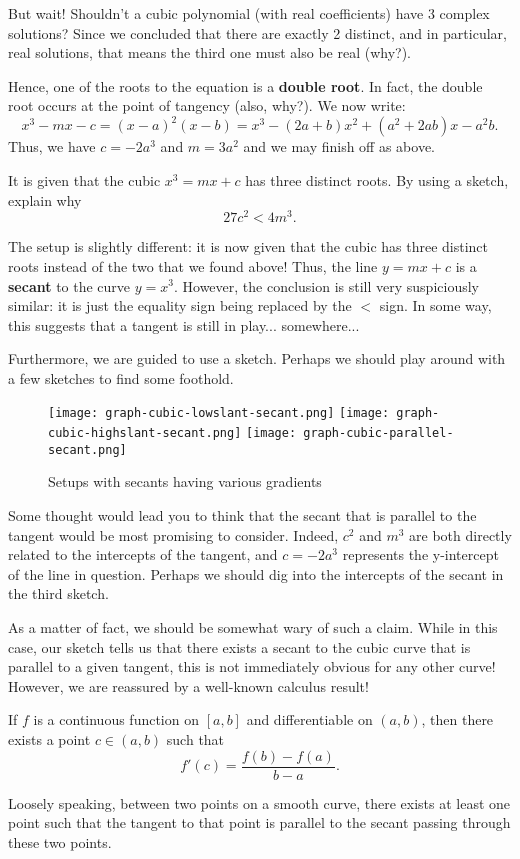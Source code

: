 \documentclass[../main.tex]{subfiles}
\begin{document}
But wait! Shouldn't a cubic polynomial (with real coefficients) have 3 complex solutions? Since we concluded that there are exactly 2 distinct, and in particular, real solutions, that means the third one must also be real (why?).

Hence, one of the roots to the equation is a \textbf{double root}. In fact, the double root occurs at the point of tangency (also, why?). We now write:
$$x^3-mx-c=(x-a)^2(x-b)=x^3-(2a+b)x^2+(a^2+2ab)x-a^2b.$$
Thus, we have $c=-2a^3$ and $m=3a^2$ and we may finish off as above.
\begin{example}[cont.]
It is given that the cubic $x^3=mx+c$ has three distinct roots. By using a sketch, explain why
$$27c^2<4m^3.$$
\end{example}
The setup is slightly different: it is now given that the cubic has three distinct roots instead of the two that we found above! Thus, the line $y=mx+c$ is a \textbf{secant} to the curve $y=x^3$. However, the conclusion is still very suspiciously similar: it is just the equality sign being replaced by the $<$ sign. In some way, this suggests that a tangent is still in play... somewhere...

Furthermore, we are guided to use a sketch. Perhaps we should play around with a few sketches to find some foothold.
\begin{figure}[H]
    \texttt{[image: graph-cubic-lowslant-secant.png]}
    \hfill
    \texttt{[image: graph-cubic-highslant-secant.png]}
    \hfill
    \texttt{[image: graph-cubic-parallel-secant.png]}
    \caption{Setups with secants having various gradients}
\end{figure}
Some thought would lead you to think that the secant that is parallel to the tangent would be most promising to consider. Indeed, $c^2$ and $m^3$ are both directly related to the intercepts of the tangent, and $c=-2a^3$ represents the y-intercept of the line in question. Perhaps we should dig into the intercepts of the secant in the third sketch.

As a matter of fact, we should be somewhat wary of such a claim. While in this case, our sketch tells us that there exists a secant to the cubic curve that is parallel to a given tangent, this is not immediately obvious for any other curve! However, we are reassured by a well-known calculus result!

\begin{theorem}
If $f$ is a continuous function on $[a,b]$ and differentiable on $(a,b)$, then there exists a point $c \in (a,b)$ such that
$$f'(c)=\frac{f(b)-f(a)}{b-a}.$$
\end{theorem}
Loosely speaking, between two points on a smooth curve, there exists at least one point such that the tangent to that point is parallel to the secant passing through these two points.
\end{document}
